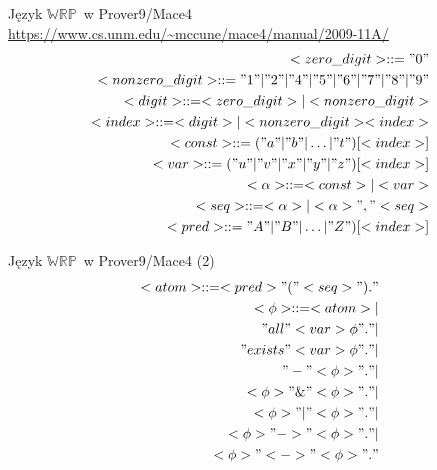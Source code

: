 \documentclass{beamer}
\newcommand {\WRP} {\ensuremath{\mathbb{WRP}}}
\begin{document}
\begin{frame}{Język \WRP\ w Prover9/Mace4}
%
\url{https://www.cs.unm.edu/~mccune/mace4/manual/2009-11A/}
%
\begin{eqnarray}
<zero\_digit> :: = "0" \\ %
<nonzero\_digit> :: = "1" | "2" | "4" | "5" | "6" | "7" | "8" | "9" \\ %
<digit> :: = <zero\_digit> | <nonzero\_digit> \\ %
<index> :: = <digit> | <nonzero\_digit><index> \\ %
<const> ::= ("a" | "b" | \dots | "t")[<index>] \\ %
<var> ::= ("u" | "v" | "x" | "y"| "z")[<index>] \\ %
<\alpha> ::= <const> | <var> \\ %
<seq> ::= <\alpha> | <\alpha>","<seq> \\ %
<pred> ::= "A" | "B" | \dots | "Z")[<index>]
\end{eqnarray}
\end{frame}

\begin{frame}{Język \WRP\ w Prover9/Mace4 (2)}
%
\begin{eqnarray}
<atom> ::= <pred>"("<seq>")." \\
%
<\phi> ::= <atom> | \nonumber  \\ 
"all"<var> \phi "." | \nonumber  \\
"exists"<var> \phi "." | \nonumber  \\
"-" <\phi> "." | \nonumber  \\
<\phi> "\&" <\phi> "." | \nonumber \\
<\phi> "|" <\phi> "." | \nonumber  \\
<\phi> "->" <\phi> "." | \nonumber  \\
<\phi> "<->" <\phi> "."
\end{eqnarray}
\end{frame}
\end{document}
